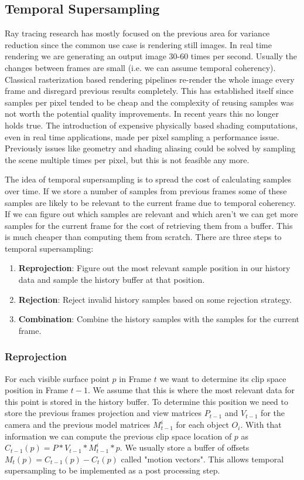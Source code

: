 \documentclass{ACGSeminar}
\begin{document}
\subsection{Temporal Supersampling}
Ray tracing research has mostly focused on the previous area for variance reduction since the common use case is rendering still images.
In real time rendering we are generating an output image 30-60 times per second. Usually the changes between frames are small (i.e. we can assume temporal coherency). Classical rasterization based rendering pipelines re-render the whole image every frame and disregard previous results completely. This has established itself since samples per pixel tended to be cheap and the complexity of reusing samples was not worth the potential quality improvements.
In recent years this no longer holds true. The introduction of expensive physically based shading computations, even in real time applications, made per pixel sampling a performance issue. Previously issues like geometry and shading aliasing could be solved by sampling the scene multiple times per pixel, but this is not feasible any more.

The idea of temporal supersampling is to spread the cost of calculating samples over time. If we store a number of samples from previous frames some of these samples are likely to be relevant to the current frame due to temporal coherency. If we can figure out which samples are relevant and which aren't we can get more samples for the current frame for the cost of retrieving them from a buffer. This is much cheaper than computing them from scratch. There are three steps to temporal supersampling:
\begin{enumerate}
\item \textbf{Reprojection}: Figure out the most relevant sample position in our history data and sample the history buffer at that position.
\item \textbf{Rejection}: Reject invalid history samples based on some rejection strategy.
\item \textbf{Combination}: Combine the history samples with the samples for the current frame.
\end{enumerate}

\subsubsection{Reprojection}
For each visible surface point $p$ in Frame $t$ we want to determine its clip space position in Frame $t-1$. We assume that this is where the most relevant data for this point is stored in the history buffer. To determine this position we need to store the previous frames projection and view matrices $P_{t-1}$ and $V_{t-1}$ for the camera and the previous model matrices $M^{i}_{t-1}$ for each object $O_i$. 
With that information we can compute the previous clip space location of $p$ as $C_{t-1}(p) = P * V_{t-1} * M^{i}_{t-1} * p$. We usually store a buffer of offsets $M_t(p) = C_{t-1}(p) - C_{t}(p)$ called "motion vectors".
This allows temporal supersampling to be implemented as a post processing step.
\end{document}
